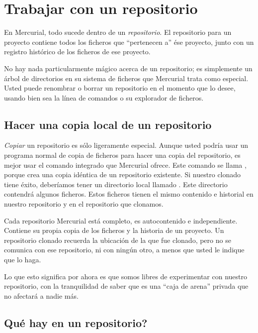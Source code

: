 \section{Trabajar con un repositorio}

En Mercurial, todo sucede dentro de un \emph{repositorio}. El
repositorio para un proyecto contiene todos los ficheros que
``pertenecen a'' ése proyecto, junto con un registro histórico de los
ficheros de ese proyecto.

No hay nada particularmente mágico acerca de un repositorio; es
simplemente un árbol de directorios en su sistema de ficheros que
Mercurial trata como especial. Usted puede renombrar o borrar un
repositorio en el momento que lo desee, usando bien sea la línea de
comandos o su explorador de ficheros.

\subsection{Hacer una copia local de un repositorio}

\emph{Copiar} un repositorio es sólo ligeramente especial. Aunque
usted podría usar un programa normal de copia de ficheros para hacer
una copia del repositorio, es mejor usar el comando integrado que
Mercurial ofrece. Este comando se llama , porque crea una copia idéntica de un
repositorio existente.
Si nuestro clonado tiene éxito, deberíamos tener un directorio local
llamado . Este directorio contendrá algunos ficheros.
Estos ficheros tienen el mismo contenido e historial en nuestro
repositorio y en el repositorio que clonamos.

Cada repositorio Mercurial está completo, es autocontenido e
independiente. Contiene su propia copia de los ficheros y la historia
de un proyecto. Un repositorio clonado recuerda la ubicación de la que
fue clonado, pero no se comunica con ese repositorio, ni con ningún
otro, a menos que usted le indique que lo haga.

Lo que esto significa por ahora es que somos libres de experimentar
con nuestro repositorio, con la tranquilidad de saber que es una
``caja de arena'' privada que no afectará a nadie más.

\subsection{Qué hay en un repositorio?}

